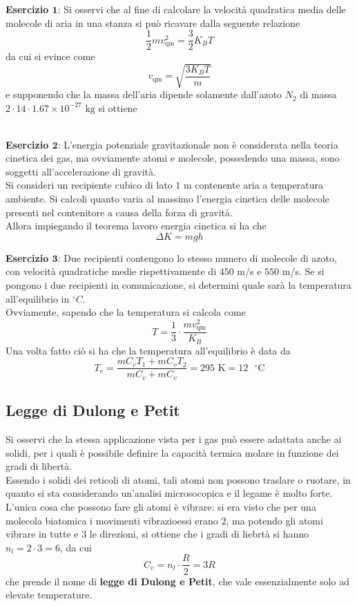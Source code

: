 \documentclass[a4paper]{extarticle}
\begin{document}
\vspace{1em}
\noindent
\textbf{Esercizio $\boldsymbol{1}$}: Si osservi che al fine di calcolare la velocità quadratica media delle molecole di aria in una stanza si può ricavare dalla seguente relazione
\[\frac{1}{2} m v_{\text{qm}}^2 = \frac{3}{2} K_B T\]
da cui si evince come
\[v_{\text{qm}} = \sqrt{\frac{3 K_B T}{m}}\]
e supponendo che la massa dell'aria dipende solamente dall'azoto $N_2$ di massa $2 \cdot 14 \cdot 1.67 \times 10^{-27} \text{ kg}$ si ottiene
\[\frac{}{}\]

\vspace{1em}
\noindent
\textbf{Esercizio $\boldsymbol{2}$}: L'energia potenziale gravitazionale non è considerata nella teoria cinetica dei gas, ma ovviamente atomi e molecole, possedendo una massa, sono soggetti all'accelerazione di gravità.\\
Si consideri un recipiente cubico di lato $1$ m contenente aria a temperatura ambiente. Si calcoli quanto varia al massimo l'energia cinetica delle molecole presenti nel contenitore a causa della forza di gravità.\\
Allora impiegando il teorema lavoro energia cinetica si ha che
\[\Delta K = m g h\]

\vspace{1em}
\noindent
\textbf{Esercizio $\boldsymbol{3}$}: Due recipienti contengono lo stesso numero di molecole di azoto, con velocità quadratiche medie rispettivamente di $450$ m/s e $550$ m/s. Se si pongono i due recipienti in comunicazione, si determini quale sarà la temperatura all'equilibrio in $^\circ C$.\\
Ovviamente, sapendo che la temperatura si calcola come
\[T= \frac{1}{3} \cdot \frac{m v_{\text{qm}}^2}{K_B}\]
Una volta fatto ciò si ha che la temperatura all'equilibrio è data da
\[T_e = \frac{m C_v T_1 + m C_v T_2}{m C_v + m C_v} = 295 \text{ K} = 12 \text{ $^\circ$C}\]

\vspace{1em}
\subsection{Legge di Dulong e Petit}
Si osservi che la stessa applicazione vista per i gas può essere adattata anche ai solidi, per i quali è possibile definire la capacità termica molare in funzione dei gradi di libertà.\\
Essendo i solidi dei reticoli di atomi, tali atomi non possono traslare o ruotare, in quanto si sta considerando un'analisi microsocopica e il legame è molto forte. L'unica cosa che possono fare gli atomi è vibrare: si era visto che per una molecola biatomica i movimenti vibrazioessi erano $2$, ma potendo gli atomi vibrare in tutte e $3$ le direzioni, si ottiene che i gradi di liebrtà si hanno $n_l = 2 \cdot 3 = 6$, da cui
\[\boxed{C_v = n_l \cdot \frac{R}{2} = 3 R}\]
che prende il nome di \textbf{legge di Dulong e Petit}, che vale essenzialmente solo ad elevate temperature.
\end{document}
